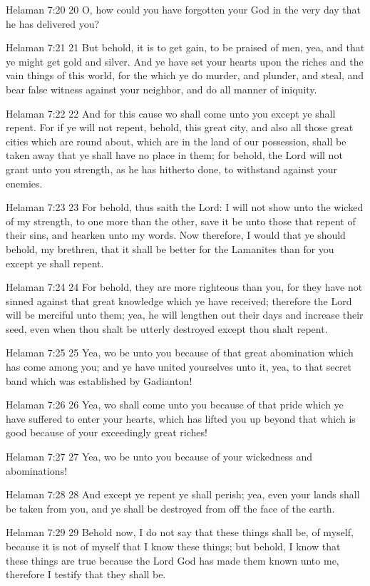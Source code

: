 Helaman 7:20
 20 O, how could you have forgotten your God in the very day that
he has delivered you?

Helaman 7:21
 21 But behold, it is to get gain, to be praised of men, yea, and
that ye might get gold and silver. And ye have set your hearts
upon the riches and the vain things of this world, for the which
ye do murder, and plunder, and steal, and bear false witness
against your neighbor, and do all manner of iniquity.

Helaman 7:22
 22 And for this cause wo shall come unto you except ye shall
repent. For if ye will not repent, behold, this great city, and
also all those great cities which are round about, which are in
the land of our possession, shall be taken away that ye shall
have no place in them; for behold, the Lord will not grant unto
you strength, as he has hitherto done, to withstand against your
enemies.

Helaman 7:23
 23 For behold, thus saith the Lord: I will not show unto the
wicked of my strength, to one more than the other, save it be
unto those that repent of their sins, and hearken unto my words.
Now therefore, I would that ye should behold, my brethren, that
it shall be better for the Lamanites than for you except ye shall
repent.

Helaman 7:24
 24 For behold, they are more righteous than you, for they have
not sinned against that great knowledge which ye have received;
therefore the Lord will be merciful unto them; yea, he will
lengthen out their days and increase their seed, even when thou
shalt be utterly destroyed except thou shalt repent.

Helaman 7:25
 25 Yea, wo be unto you because of that great abomination which
has come among you; and ye have united yourselves unto it, yea,
to that secret band which was established by Gadianton!

Helaman 7:26
 26 Yea, wo shall come unto you because of that pride which ye
have suffered to enter your hearts, which has lifted you up
beyond that which is good because of your exceedingly great
riches!

Helaman 7:27
 27 Yea, wo be unto you because of your wickedness and
abominations!

Helaman 7:28
 28 And except ye repent ye shall perish; yea, even your lands
shall be taken from you, and ye shall be destroyed from off the
face of the earth.

Helaman 7:29
 29 Behold now, I do not say that these things shall be, of
myself, because it is not of myself that I know these things; but
behold, I know that these things are true because the Lord God
has made them known unto me, therefore I testify that they shall
be.

